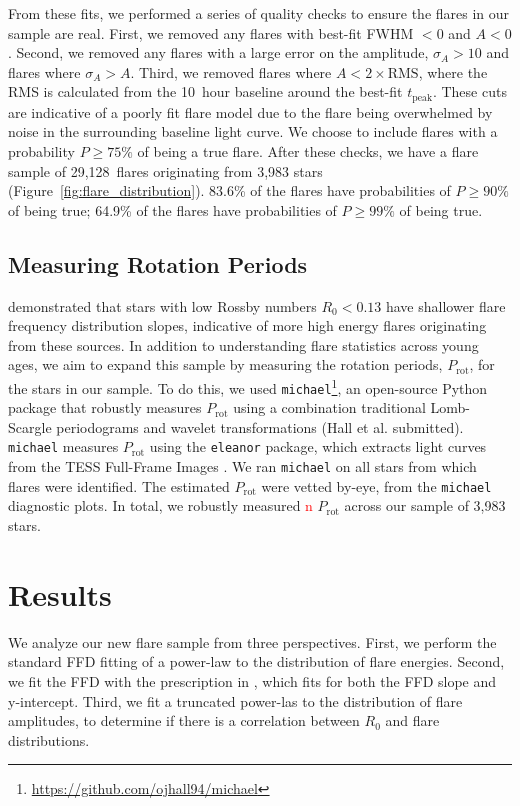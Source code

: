 \documentclass[twocolumn]{aastex631}
\begin{document}
From these fits, we performed a series of quality checks to ensure the flares
in our sample are real. First, we removed any flares with best-fit FWHM $ < 0$
and $A < 0$. Second, we removed any flares with a large error on the amplitude,
$\sigma_A > 10$ and flares where $\sigma_A > A$. Third, we removed flares where
$A < 2 \times \textrm{RMS}$, where the RMS is calculated from the 10~hour baseline
around the best-fit $t_\textrm{peak}$. These cuts are indicative of a poorly fit
flare model due to the flare being overwhelmed by noise in the surrounding baseline
light curve. We choose to include flares with a probability $P \geq 75\%$ of being
a true flare. After these checks, we have a flare sample of 29,128~flares originating
from 3,983 stars (Figure~\ref{fig:flare_distribution}). 83.6\% of the flares have
probabilities of $P \geq 90\%$ of being true; 64.9\% of the flares have probabilities
of $P \geq 99\%$ of being true.


\subsection{Measuring Rotation Periods}

\cite{seligman22} demonstrated that stars with low Rossby numbers $R_0 < 0.13$ have
shallower flare frequency distribution slopes, indicative of more high energy flares
originating from these sources. In addition to understanding flare statistics across
young ages, we aim to expand this sample by measuring the rotation periods, $P_\textrm{rot}$,
for the stars in our sample. To do this, we used \texttt{michael}\footnote{\url{https://github.com/ojhall94/michael}},
an open-source Python package that robustly measures $P_\textrm{rot}$ using a combination
traditional Lomb-Scargle periodograms and wavelet transformations (Hall et al. submitted).
\texttt{michael} measures $P_\textrm{rot}$ using the \texttt{eleanor} package, which
extracts light curves from the TESS Full-Frame Images \citep[FFIs;][]{feinstein19}.
We ran \texttt{michael} on all stars from which flares were identified. The estimated
$P_\textrm{rot}$ were vetted by-eye, from the \texttt{michael} diagnostic plots. In
total, we robustly measured \textcolor{red}{n} $P_\textrm{rot}$ across our sample of
3,983 stars.


\section{Results}\label{sec:results}

We analyze our new flare sample from three perspectives. First, we perform the standard
FFD fitting of a power-law to the distribution of flare energies. Second, we fit the FFD with the
prescription in \cite{gershberg72}, which fits for both the FFD slope and y-intercept.
Third, we fit a truncated power-las to the distribution of flare amplitudes, to determine
if there is a correlation between $R_0$ and flare distributions.
\end{document}
